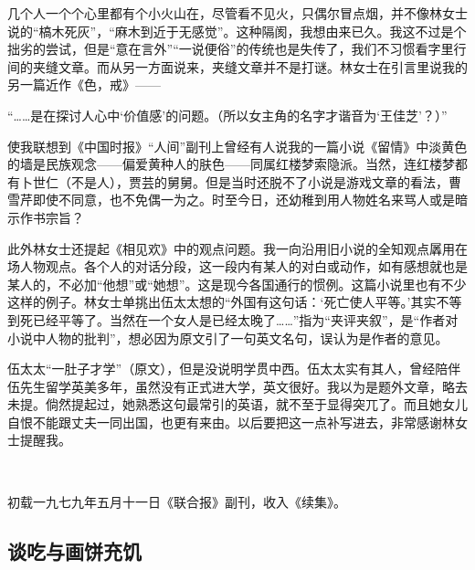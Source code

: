 \par 几个人一个个心里都有个小火山在，尽管看不见火，只偶尔冒点烟，并不像林女士说的“槁木死灰”，“麻木到近于无感觉”。这种隔阂，我想由来已久。我这不过是个拙劣的尝试，但是“意在言外”“一说便俗”的传统也是失传了，我们不习惯看字里行间的夹缝文章。而从另一方面说来，夹缝文章并不是打谜。林女士在引言里说我的另一篇近作《色，戒》——
\par “……是在探讨人心中‘价值感’的问题。（所以女主角的名字才谐音为‘王佳芝’？）”
\par 使我联想到《中国时报》“人间”副刊上曾经有人说我的一篇小说《留情》中淡黄色的墙是民族观念——偏爱黄种人的肤色——同属红楼梦索隐派。当然，连红楼梦都有卜世仁（不是人），贾芸的舅舅。但是当时还脱不了小说是游戏文章的看法，曹雪芹即使不同意，也不免偶一为之。时至今日，还幼稚到用人物姓名来骂人或是暗示作书宗旨？
\par 此外林女士还提起《相见欢》中的观点问题。我一向沿用旧小说的全知观点羼用在场人物观点。各个人的对话分段，这一段内有某人的对白或动作，如有感想就也是某人的，不必加“他想”或“她想”。这是现今各国通行的惯例。这篇小说里也有不少这样的例子。林女士单挑出伍太太想的“外国有这句话：‘死亡使人平等。’其实不等到死已经平等了。当然在一个女人是已经太晚了……”指为“夹评夹叙”，是“作者对小说中人物的批判”，想必因为原文引了一句英文名句，误认为是作者的意见。
\par 伍太太“一肚子才学”（原文），但是没说明学贯中西。伍太太实有其人，曾经陪伴伍先生留学英美多年，虽然没有正式进大学，英文很好。我以为是题外文章，略去未提。倘然提起过，她熟悉这句最常引的英语，就不至于显得突兀了。而且她女儿自恨不能跟丈夫一同出国，也更有来由。以后要把这一点补写进去，非常感谢林女士提醒我。
\par  
\par *初载一九七九年五月十一日《联合报》副刊，收入《续集》。


\subsection{谈吃与画饼充饥}


